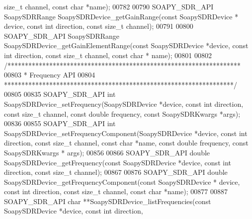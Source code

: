 \begin{DoxyCode}
       \textcolor{keywordtype}{size\_t} channel, \textcolor{keyword}{const} \textcolor{keywordtype}{char} *name);
00782 
00790 SOAPY_SDR_API SoapySDRRange SoapySDRDevice_getGainRange(\textcolor{keyword}{const} SoapySDRDevice *
      device, \textcolor{keyword}{const} \textcolor{keywordtype}{int} direction, \textcolor{keyword}{const} \textcolor{keywordtype}{size\_t} channel);
00791 
00800 SOAPY_SDR_API SoapySDRRange SoapySDRDevice_getGainElementRange(\textcolor{keyword}{const} 
      SoapySDRDevice *device, \textcolor{keyword}{const} \textcolor{keywordtype}{int} direction, \textcolor{keyword}{const} \textcolor{keywordtype}{size\_t} channel, \textcolor{keyword}{const} \textcolor{keywordtype}{char} *
      name);
00801 
00802 \textcolor{comment}{/*******************************************************************}
00803 \textcolor{comment}{ * Frequency API}
00804 \textcolor{comment}{ ******************************************************************/}
00805 
00835 SOAPY_SDR_API \textcolor{keywordtype}{int} SoapySDRDevice_setFrequency(SoapySDRDevice *device, \textcolor{keyword}{const} \textcolor{keywordtype}{int} direction, \textcolor{keyword}{const} \textcolor{keywordtype}{size\_t} 
      channel, \textcolor{keyword}{const} \textcolor{keywordtype}{double} frequency, \textcolor{keyword}{const} SoapySDRKwargs *args);
00836 
00855 SOAPY_SDR_API \textcolor{keywordtype}{int} SoapySDRDevice_setFrequencyComponent(SoapySDRDevice *device, \textcolor{keyword}{const} \textcolor{keywordtype}{int} direction, \textcolor{keyword}{const} \textcolor{keywordtype}{
      size\_t} channel, \textcolor{keyword}{const} \textcolor{keywordtype}{char} *name, \textcolor{keyword}{const} \textcolor{keywordtype}{double} frequency, \textcolor{keyword}{const} SoapySDRKwargs *
      args);
00856 
00866 SOAPY_SDR_API \textcolor{keywordtype}{double} SoapySDRDevice_getFrequency(\textcolor{keyword}{const} SoapySDRDevice *device, \textcolor{keyword}{const} \textcolor{keywordtype}{int} direction, \textcolor{keyword}{const} \textcolor{keywordtype}{
      size\_t} channel);
00867 
00876 SOAPY_SDR_API \textcolor{keywordtype}{double} SoapySDRDevice_getFrequencyComponent(\textcolor{keyword}{const} SoapySDRDevice *
      device, \textcolor{keyword}{const} \textcolor{keywordtype}{int} direction, \textcolor{keyword}{const} \textcolor{keywordtype}{size\_t} channel, \textcolor{keyword}{const} \textcolor{keywordtype}{char} *name);
00877 
00887 SOAPY_SDR_API \textcolor{keywordtype}{char} **SoapySDRDevice_listFrequencies(\textcolor{keyword}{const} SoapySDRDevice *device, \textcolor{keyword}{const} \textcolor{keywordtype}{int} direction, \textcolor{keyword}{
}
\end{DoxyCode}
